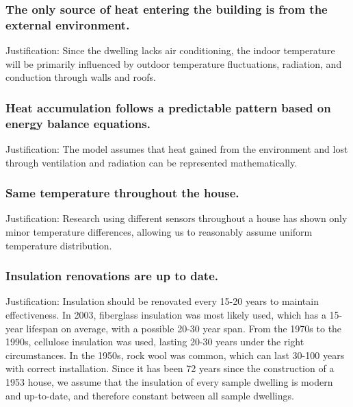 \documentclass[12pt]{article}
\begin{document}
\subsubsection{The only source of heat entering the building is from the external environment.}
Justification: Since the dwelling lacks air conditioning, the indoor temperature will be primarily influenced by outdoor temperature fluctuations, radiation, and conduction through walls and roofs.\cite{https://pmc.ncbi.nlm.nih.gov/articles/PMC4352572/}

\subsubsection{Heat accumulation follows a predictable pattern based on energy balance equations.}
Justification: The model assumes that heat gained from the environment and lost through ventilation and radiation can be represented mathematically. \cite{https://pmc.ncbi.nlm.nih.gov/articles/PMC4352572/}\cite{https://pmc.ncbi.nlm.nih.gov/articles/PMC4121079/}\cite{https://www.engineeringtoolbox.com/heat-transfer-d_430.html}

\subsubsection{Same temperature throughout the house.}
Justification: Research using different sensors throughout a house has shown only minor temperature differences, allowing us to reasonably assume uniform temperature distribution.\cite{https://pmc.ncbi.nlm.nih.gov/articles/PMC4456148/}

\subsubsection{Insulation renovations are up to date.}
Justification: Insulation should be renovated every 15-20 years to maintain effectiveness. In 2003, fiberglass insulation was most likely used, which has a 15-year lifespan on average, with a possible 20-30 year span. From the 1970s to the 1990s, cellulose insulation was used, lasting 20-30 years under the right circumstances. In the 1950s, rock wool was common, which can last 30-100 years with correct installation. Since it has been 72 years since the construction of a 1953 house, we assume that the insulation of every sample dwelling is modern and up-to-date, and therefore constant between all sample dwellings. \cite{https://sealed.com/resources/how-long-does-insulation-last/}
\end{document}
